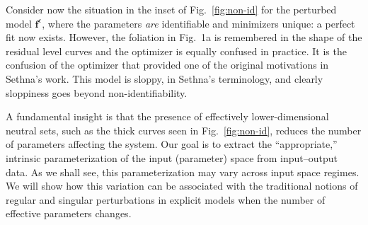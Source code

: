 Consider now the situation in the inset of Fig.~\ref{fig:non-id} for
the perturbed model $\mathbf{f}^\epsilon$, where the parameters \emph{are}
identifiable and minimizers unique: a perfect fit now exists.
However, the foliation in Fig.~1a is remembered in the shape of the
residual level curves and the optimizer is equally confused in
practice.  It is the confusion of the optimizer that provided one of
the original motivations in Sethna's work.  This model is sloppy, in
Sethna's terminology, and clearly sloppiness goes beyond
non-identifiability.

A fundamental insight is that the presence of effectively
lower-dimensional neutral sets, such as the thick curves seen in
Fig.~\ref{fig:non-id}, reduces the number of parameters affecting the
system.  Our goal is to extract the ``appropriate,'' intrinsic
parameterization of the input (parameter) space from input--output
data.  As we shall see, this parameterization may vary across input
space regimes.  We will show how this variation can be associated with
the traditional notions of regular and singular perturbations in
explicit models when the number of effective parameters changes.



















